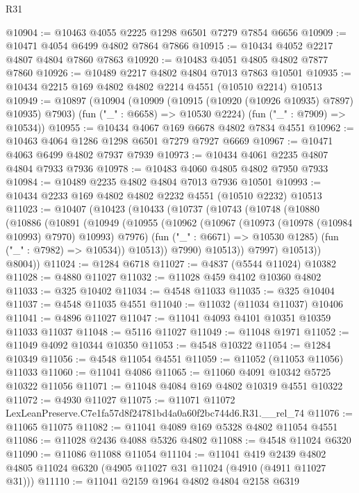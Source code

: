 \begin{lexlean}{R31}
\begin{coremodule}
@10904 := @10463 @4055 @2225 @1298 @6501 @7279 @7854 @6656
@10909 := @10471 @4054 @6499 @4802 @7864 @7866
@10915 := @10434 @4052 @2217 @4807 @4804 @7860 @7863
@10920 := @10483 @4051 @4805 @4802 @7877 @7860
@10926 := @10489 @2217 @4802 @4804 @7013 @7863 @10501
@10935 := @10434 @2215 @169 @4802 @4802 @2214 @4551 (@10510 @2214) @10513
@10949 := @10897
    (@10904
      (@10909 (@10915 (@10920 (@10926 @10935) @7897) @10935) @7903)
      (fun ("_" : @6658) => @10530 @2224)
      (fun ("_" : @7909) => @10534))
@10955 := @10434 @4067 @169 @6678 @4802 @7834 @4551
@10962 := @10463 @4064 @1286 @1298 @6501 @7279 @7927 @6669
@10967 := @10471 @4063 @6499 @4802 @7937 @7939
@10973 := @10434 @4061 @2235 @4807 @4804 @7933 @7936
@10978 := @10483 @4060 @4805 @4802 @7950 @7933
@10984 := @10489 @2235 @4802 @4804 @7013 @7936 @10501
@10993 := @10434 @2233 @169 @4802 @4802 @2232 @4551 (@10510 @2232) @10513
@11023 := @10407
    (@10423
      (@10433
        (@10737
          (@10743
            (@10748
              (@10880
                (@10886
                  (@10891
                    (@10949
                      (@10955
                        (@10962
                          (@10967 (@10973 (@10978 (@10984 @10993) @7970) @10993) @7976)
                          (fun ("_" : @6671) => @10530 @1285)
                          (fun ("_" : @7982) => @10534))
                        @10513))
                    @7990)
                  @10513))
              @7997)
            @10513))
        @8004))
@11024 := @1284 @6718
@11027 := @4837 (@5544 @11024) @10382
@11028 := @4880 @11027
@11032 := @11028 @459 @4102 @10360 @4802
@11033 := @325 @10402
@11034 := @4548 @11033
@11035 := @325 @10404
@11037 := @4548 @11035 @4551
@11040 := @11032 (@11034 @11037) @10406
@11041 := @4896 @11027
@11047 := @11041 @4093 @4101 @10351 @10359 @11033 @11037
@11048 := @5116 @11027
@11049 := @11048 @1971
@11052 := @11049 @4092 @10344 @10350
@11053 := @4548 @10322
@11054 := @1284 @10349
@11056 := @4548 @11054 @4551
@11059 := @11052 (@11053 @11056) @11033
@11060 := @11041 @4086
@11065 := @11060 @4091 @10342 @5725 @10322 @11056
@11071 := @11048 @4084 @169 @4802 @10319 @4551 @10322
@11072 := @4930 @11027
@11075 := @11071 @11072 LexLeanPreserve.C7e1fa57d8f24781bd4a0a60f2bc744d6.R31.__rel_74
@11076 := @11065 @11075
@11082 := @11041 @4089 @169 @5328 @4802 @11054 @4551
@11086 := @11028 @2436 @4088 @5326 @4802
@11088 := @4548 @11024 @6320
@11090 := @11086 @11088 @11054
@11104 := @11041
    @419
    @2439
    @4802
    @4805
    @11024
    @6320
    (@4905 @11027 @31 @11024 (@4910 (@4911 @11027 @31)))
@11110 := @11041 @2159 @1964 @4802 @4804 @2158 @6319

\end{coremodule}
\end{lexlean}
